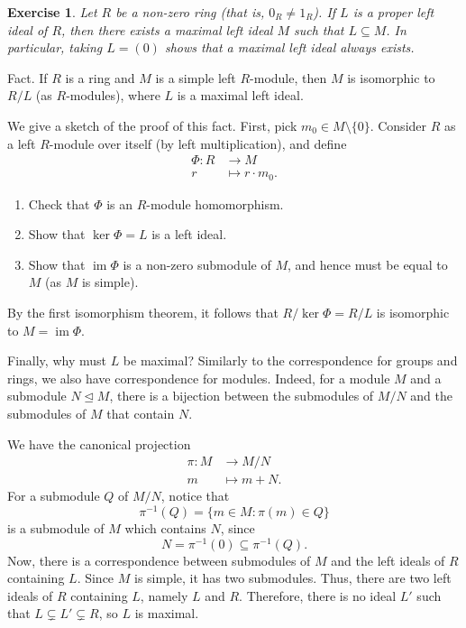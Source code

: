 \documentclass[10pt]{article}
\numberwithin{equation}{section}
\DeclareMathOperator{\im}{im}
\theoremstyle{newstyle}
\newtheorem{exercise}[thm]{Exercise}
\begin{document}
\begin{exercise}
Let $R$ be a non-zero ring (that is, $0_R \neq 1_R$). If $L$ is a proper left ideal of $R$, then 
there exists a maximal left ideal $M$ such that $L \subseteq M$. In particular, taking 
$L = (0)$ shows that a maximal left ideal always exists. 
\end{exercise}

{\sc Fact.} If $R$ is a ring and $M$ is a simple left $R$-module, then $M$ is isomorphic to 
$R/L$ (as $R$-modules), where $L$ is a maximal left ideal. 

We give a sketch of the proof of this fact. First, pick $m_0 \in M \setminus \{0\}$. Consider 
$R$ as a left $R$-module over itself (by left multiplication), and define 
\begin{align*}
    \Phi : R &\to M \\ r &\mapsto r \cdot m_0. 
\end{align*}
\begin{enumerate}[(1)]
    \item Check that $\Phi$ is an $R$-module homomorphism. 
    \item Show that $\ker\Phi = L$ is a left ideal.
    \item Show that $\im\Phi$ is a non-zero submodule of $M$, and hence must be equal to $M$ 
    (as $M$ is simple).
\end{enumerate}
By the first isomorphism theorem, it follows that $R/\ker\Phi = R/L$ is isomorphic to $M = \im\Phi$. 

Finally, why must $L$ be maximal? Similarly to the correspondence for groups and rings, we also have 
correspondence for modules. Indeed, for a module $M$ and a submodule $N \trianglelefteq M$, there 
is a bijection between the submodules of $M/N$ and the submodules of $M$ that contain $N$. 

We have the canonical projection 
\begin{align*}
    \pi : M &\to M/N \\ m &\mapsto m + N.
\end{align*} 
For a submodule $Q$ of $M/N$, notice that 
\[ \pi^{-1}(Q) = \{m \in M : \pi(m) \in Q\} \] 
is a submodule of $M$ which contains $N$, since 
\[ N = \pi^{-1}(0) \subseteq \pi^{-1}(Q). \]
Now, there is a correspondence between submodules of $M$ and the left ideals of $R$ containing $L$. 
Since $M$ is simple, it has two submodules. Thus, there are two left ideals of $R$ containing $L$, namely $L$ and $R$. Therefore, there is no ideal $L'$ such that $L \subsetneq L' \subsetneq R$, so $L$ is 
maximal.
\end{document}
